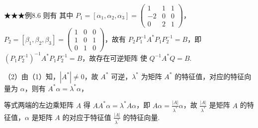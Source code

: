\begin{fcard}{★★★例8.6}
则有
其中 $P_1=[\alpha_1,\alpha_2,\alpha_3]=\begin{pmatrix}1&1&1\\-2&0&0\\0&2&1\end{pmatrix}$，$P_2=[\beta_1,\beta_2,\beta_3]=\begin{pmatrix}1&0&0\\1&0&1\\0&1&0\end{pmatrix}$，故有 $P_2P_1^{-1}A^{*}P_1P_2^{-1}=B$，即 $(P_1P_2^{-1})^{-1}A^{*}P_1P_2^{-1}=B$，故存在可逆矩阵
使 $Q^{-1}A^{*}Q=B$.

（2）由（1）知，$|A^{*}|\ne0$，故 $A^{*}$ 可逆，$\lambda^{*}$ 为矩阵 $A^{*}$ 的特征值，对应的特征向量为 $\alpha$，则有 $A^{*}\alpha=\lambda^{*}\alpha$，

等式两端的左边乘矩阵 $A$ 得 $AA^{*}\alpha=\lambda^{*}A\alpha$，即 $A\alpha=\frac{|A|}{\lambda^{*}}\alpha$，故 $\frac{|A|}{\lambda^{*}}$ 是矩阵 $A$ 的特征值，$\alpha$ 是矩阵 $A$ 的对应于特征值 $\frac{|A|}{\lambda^{*}}$ 的特征向量.
\end{fcard}

